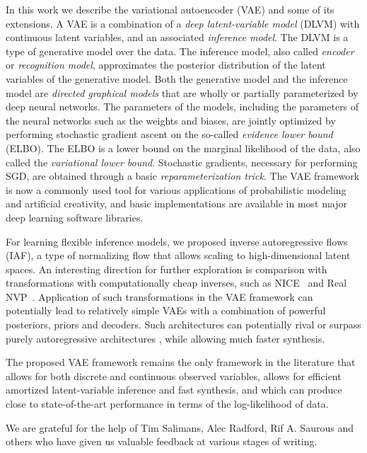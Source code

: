 \documentclass[MAL,biber]{nowfnt} %
\begin{document}
In this work we describe the variational autoencoder (VAE) and some of its extensions. A VAE is a combination of a \emph{deep latent-variable model} (DLVM) with continuous latent variables, and an associated \emph{inference model}. The DLVM is a type of generative model over the data. The inference model, also called \emph{encoder} or \emph{recognition model}, approximates the posterior distribution of the latent variables of the generative model. Both the generative model and the inference model are \emph{directed graphical models} that are wholly or partially parameterized by deep neural networks. The parameters of the models, including the parameters of the neural networks such as the weights and biases, are jointly optimized by performing stochastic gradient ascent on the so-called \emph{evidence lower bound} (ELBO). The ELBO is a lower bound on the marginal likelihood of the data, also called the \emph{variational lower bound}. Stochastic gradients, necessary for performing SGD, are obtained through a basic \emph{reparameterization trick}. The VAE framework is now a commonly used tool for various applications of probabilistic modeling and artificial creativity, and basic implementations are available in most major deep learning software libraries.

For learning flexible inference models, we proposed inverse autoregressive flows (IAF), a type of normalizing flow that allows scaling to high-dimensional latent spaces. 
An interesting direction for further exploration is comparison with transformations with computationally cheap inverses, such as NICE~\citep{dinh2014nice} and Real NVP~\citep{dinh2016density}. Application of such transformations in the VAE framework can potentially lead to relatively simple VAEs with a combination of powerful posteriors, priors and decoders. Such architectures can potentially rival or surpass purely autoregressive architectures \citep{van2016conditional}, while allowing much faster synthesis.

The proposed VAE framework remains the only framework in the literature that allows for both discrete and continuous observed variables, allows for efficient amortized latent-variable inference and fast synthesis, and which can produce close to state-of-the-art performance in terms of the log-likelihood of data.

\begin{acknowledgements}
We are grateful for the help of Tim Salimans, Alec Radford, Rif A. Saurous and others who have given us valuable feedback at various stages of writing.
\end{acknowledgements}
\end{document}

